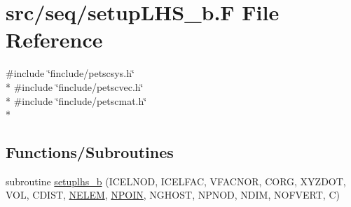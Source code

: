 \hypertarget{seq_2setup_l_h_s__b_8_f}{\section{src/seq/setup\-L\-H\-S\-\_\-b.F File Reference}
\label{seq_2setup_l_h_s__b_8_f}
}
{\ttfamily \#include \char`\"{}finclude/petscsys.\-h\char`\"{}}\\*
{\ttfamily \#include \char`\"{}finclude/petscvec.\-h\char`\"{}}\\*
{\ttfamily \#include \char`\"{}finclude/petscmat.\-h\char`\"{}}\\*
\subsection*{Functions/\-Subroutines}
\begin{DoxyCompactItemize}
\item 
subroutine \hyperlink{seq_2setup_l_h_s__b_8_f_a3bc0e4b4e5b397e696909a58b1a8b0d8}{setuplhs\-\_\-b} (I\-C\-E\-L\-N\-O\-D, I\-C\-E\-L\-F\-A\-C, V\-F\-A\-C\-N\-O\-R, C\-O\-R\-G, X\-Y\-Z\-D\-O\-T, V\-O\-L, C\-D\-I\-S\-T, \hyperlink{mesh_8com_aee5e75b79d0e815c0603cfbccc618957}{N\-E\-L\-E\-M}, \hyperlink{mesh_8com_ae28c1572321efcd8715b974d87d20c58}{N\-P\-O\-I\-N}, N\-G\-H\-O\-S\-T, N\-P\-N\-O\-D, N\-D\-I\-M, N\-O\-F\-V\-E\-R\-T, C)
\end{DoxyCompactItemize}


